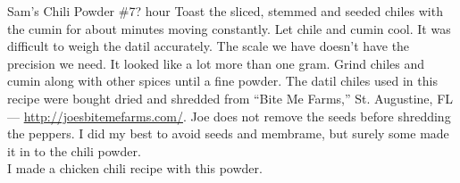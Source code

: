 \begin{recipe}{Sam's Chili Powder \#7}{?}{ hour}
Toast the sliced, stemmed and seeded chiles with the cumin for about \unit[3--4]{minutes} moving constantly.  Let chile and cumin cool.
\freeform It was difficult to weigh the datil accurately.  The scale we have doesn't have the precision we need.  It looked like a lot more than one gram.
Grind chiles and cumin along with other spices until a fine powder.
\freeform The datil chiles used in this recipe were bought dried and shredded from ``Bite Me Farms,'' St. Augustine, FL --- \url{http://joesbitemefarms.com/}. Joe does not remove the seeds before shredding the peppers.  I did my best to avoid seeds and membrame, but surely some made it in to the chili powder.\\
I made a chicken chili recipe with this powder.
\end{recipe}
